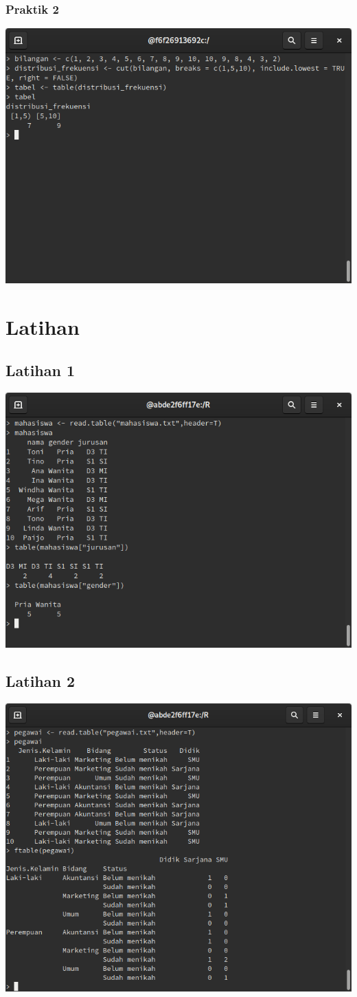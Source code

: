 \documentclass[a4paper,12pt]{article}
\begin{document}
\subsubsection{Praktik 2}
\includegraphics[width=\linewidth]{4}
\section{Latihan}
\subsection{Latihan 1}
\includegraphics[width=\linewidth]{5}
\subsection{Latihan 2}
\includegraphics[width=\linewidth]{6}
\end{document}
